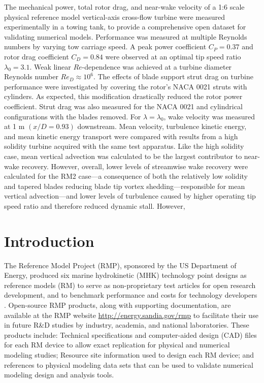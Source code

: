 \documentclass[10pt,letterpaper]{article}
\begin{document}
The mechanical power, total rotor drag, and near-wake velocity of a 1:6 scale
physical reference model vertical-axis cross-flow turbine were measured
experimentally in a towing tank, to provide a comprehensive open dataset for
validating numerical models. Performance was measured at multiple Reynolds
numbers by varying tow carriage speed. A peak power coefficient $C_P = 0.37$ and
rotor drag coefficient $C_D = 0.84$ were observed at an optimal tip speed ratio
$\lambda_0 = 3.1$. Weak linear $Re$-dependence was achieved at a turbine
diameter Reynolds number $Re_D \approx 10^6$. The effects of blade support strut
drag on turbine performance were investigated by covering the rotor's NACA 0021
struts with cylinders. As expected, this modification drastically reduced the
rotor power coefficient. Strut drag was also measured for the NACA 0021 and
cylindrical configurations with the blades removed. For $\lambda=\lambda_0$,
wake velocity was measured at 1 m $(x/D=0.93)$ downstream. Mean velocity,
turbulence kinetic energy, and mean kinetic energy transport were compared with
results from a high solidity turbine acquired with the same test apparatus. Like
the high solidity case, mean vertical advection was calculated to be the largest
contributor to near-wake recovery. However, overall, lower levels of streamwise
wake recovery were calculated for the RM2 case---a consequence of both the
relatively low solidity and tapered blades reducing blade tip vortex
shedding---responsible for mean vertical advection---and lower levels of
turbulence caused by higher operating tip speed ratio and therefore reduced
dynamic stall. However,


\section*{Introduction}

The Reference Model Project (RMP), sponsored by the US Department of Energy,
produced six marine hydrokinetic (MHK) technology point designs as reference
models (RM) to serve as non-proprietary test articles for open research
development, and to benchmark performance and costs for technology developers
\cite{Neary2014, Neary2014a}. Open-source RMP products, along with supporting
documentation, are available at the RMP website
\url{http://energy.sandia.gov/rmp} to facilitate their use in future R\&D
studies by industry, academia, and national laboratories. These products
include: Technical specifications and computer-aided design (CAD) files for each
RM device to allow exact replication for physical and numerical modeling
studies; Resource site information used to design each RM device; and references
to physical modeling data sets that can be used to validate numerical modeling
design and analysis tools.
\end{document}
